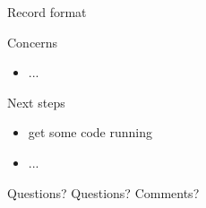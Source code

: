 \documentclass{beamer}
\begin{document}
\begin{frame}{Record format}
\end{frame}

\begin{frame}{Concerns}
  \begin{itemize}
    \item ...
  \end{itemize}
\end{frame}

\begin{frame}{Next steps}
  \begin{itemize}
    \item get some code running
    \item ...
  \end{itemize}
\end{frame}

\begin{frame}{Questions?}
Questions? Comments?

\end{frame}
\end{document}
